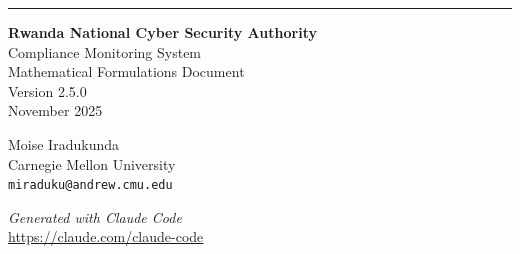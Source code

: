 \documentclass[12pt,a4paper]{article}
\begin{document}
\vfill

\begin{center}
\rule{0.5\textwidth}{0.4pt}

\textbf{Rwanda National Cyber Security Authority} \\
Compliance Monitoring System \\
Mathematical Formulations Document \\
Version 2.5.0 \\
November 2025

\vspace{0.3cm}

Moise Iradukunda \\
Carnegie Mellon University \\
\texttt{miraduku@andrew.cmu.edu}

\vspace{0.3cm}

\textit{Generated with Claude Code} \\
\url{https://claude.com/claude-code}
\end{center}
\end{document}
